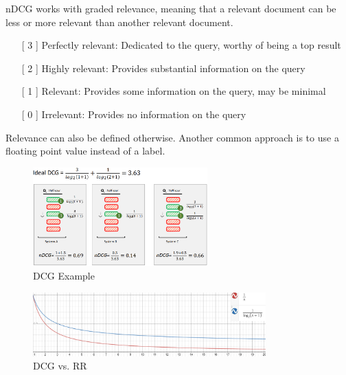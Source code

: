 \documentclass[
../../NLP4W_Summary.tex,
]
{subfiles}
\begin{document}
nDCG works with graded relevance, meaning that a relevant document can be less or more relevant than another relevant document. 

\begin{defbox}
    \begin{itemize}
        \item[[  3]] Perfectly relevant: Dedicated to the query, worthy of being a top result
        \item[[  2]] Highly relevant: Provides substantial information on the query
        \item[[  1]] Relevant: Provides some information on the query, may be minimal
        \item[[  0]] Irrelevant: Provides no information on the query
    \end{itemize}
    Relevance can also be defined otherwise. Another common approach is to use a floating point value instead of a label.
\end{defbox}

\begin{defbox}
    \begin{center}
        \begin{smallmathbox*}
        \end{smallmathbox*}

        \begin{smallmathbox*}
        \end{smallmathbox*}
    \end{center}
\end{defbox}

\begin{figure}
    [htp]
    \centering
    \includegraphics[width=0.6\textwidth]{Pics/DCGExample.png}
    \caption{DCG Example}
\end{figure}

\begin{figure}
    [htp]
    \centering
    \includegraphics[width=0.8\textwidth]{Pics/DCGVsRR.png}
    \caption{DCG vs. RR}
\end{figure}
\end{document}
